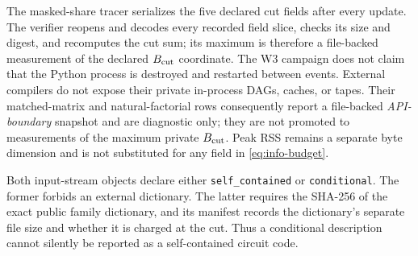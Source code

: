 \begin{remark}
\label{rem:observable-boundary-accounting}
The masked-share tracer serializes the five declared cut fields after every
update.  The verifier reopens and decodes every recorded field slice, checks
its size and digest, and recomputes the cut sum; its maximum is therefore a
file-backed measurement of the declared $B_{\rm cut}$ coordinate.  The W3
campaign does not claim that the Python process is destroyed and restarted
between events.  External compilers do not expose their private in-process DAGs,
caches, or tapes.  Their matched-matrix and natural-factorial rows consequently
report a file-backed \emph{API-boundary} snapshot and are diagnostic only; they
are not promoted to measurements of the maximum private $B_{\rm cut}$.  Peak
RSS remains a separate byte dimension and is not substituted for any field in
\eqref{eq:info-budget}.
\end{remark}

\begin{remark}
\label{rem:dictionary-accounting-code}
Both input-stream objects declare either \texttt{self\_contained} or
\texttt{conditional}.  The former forbids an external dictionary.  The latter
requires the SHA-256 of the exact public family dictionary, and its manifest
records the dictionary's separate file size and whether it is charged at the
cut.  Thus a conditional description cannot silently be reported as a
self-contained circuit code.
\end{remark}
